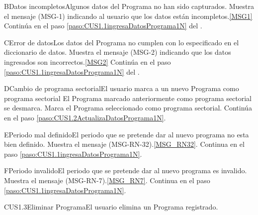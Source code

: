 	\begin{UCtrayectoriaA}{B}{Datos incompletos}{Algunos datos del Programa no han sido capturados.}
			\UCpaso Muestra el mensaje (MSG-1) indicando al usuario que los datos est\'an incompletos.\ref{MSG1}
			\UCpaso Contin\'ua en el paso \ref{paso:CUS1.1ingresaDatosPrograma1N} del .
	\end{UCtrayectoriaA}
		
	\begin{UCtrayectoriaA}{C}{Error de datos}{Los datos del Programa no cumplen con lo especificado en el diccionario de datos.}
			\UCpaso Muestra el mensaje (MSG-2) indicando que los datos ingresados son incorrectos.\ref{MSG2}
			\UCpaso Contin\'ua en el paso \ref{paso:CUS1.1ingresaDatosPrograma1N} del .
	\end{UCtrayectoriaA}

	\begin{UCtrayectoriaA}{D}{Cambio de programa sectorial}{El usuario marca a un nuevo Programa como programa sectorial}
                        \UCpaso El Programa marcado anteriormente como programa sectorial se desmarca.
			\UCpaso Marca el Programa seleccionado como programa sectorial.
			\UCpaso Contin\'ua en el paso \ref{paso:CUS1.2ActualizaDatosPrograma1N}.
	\end{UCtrayectoriaA}

	\begin{UCtrayectoriaA}{E}{Periodo mal definido}{El periodo que se pretende dar al nuevo programa no esta bien definido.}
		\UCpaso Muestra el mensaje (MSG-RN-32).\ref{MSG_RN32}.
		\UCpaso Continua en el paso \ref{paso:CUS1.1ingresaDatosPrograma1N}.
	\end{UCtrayectoriaA}

	\begin{UCtrayectoriaA}{F}{Periodo invalido}{El periodo que se pretende dar al nuevo programa es invalido.}
		\UCpaso Muestra el mensaje (MSG-RN-7).\ref{MSG_RN7}.
		\UCpaso Continua en el paso \ref{paso:CUS1.1ingresaDatosPrograma1N}.
	\end{UCtrayectoriaA}

	\begin{UseCase}{CUS1.3}{Eliminar Programa}{El usuario elimina un Programa registrado.}
	\end{UseCase}

